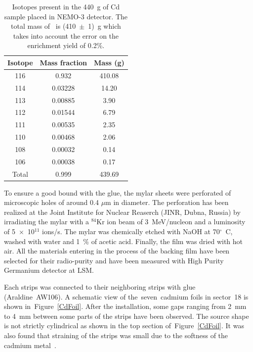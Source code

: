 \documentclass[main.tex]{subfiles}
\begin{document}
\begin{table}[h!]
\begin{center}
\begin{tabular}{c|c|c}
\toprule
Isotope & Mass fraction & Mass (g) \\
\midrule
116   & 0.932   & 410.08 \\[0.05cm]
114   & 0.03228 & 14.20  \\[0.05cm]
113   & 0.00885 & 3.90   \\[0.05cm]
112   & 0.01544 & 6.79   \\[0.05cm]
111   & 0.00535 & 2.35   \\[0.05cm]
110   & 0.00468 & 2.06   \\[0.05cm]
108   & 0.00032 & 0.14   \\[0.05cm]
106   & 0.00038 & 0.17   \\[0.05cm]
Total & 0.999   & 439.69 \\[0.05cm]
\bottomrule
\end{tabular}
\end{center}
\caption{Isotopes present in the 440~g of Cd sample placed in NEMO-3 detector. The total mass of \Cd~is (410~$\pm$~1)~g which takes into account the error on the enrichment yield of 0.2\%.}
\label{tab:IsotopeCdTable}
\end{table}


\bigskip


\NI To ensure a good bound with the glue, the mylar sheets were perforated of microscopic holes of around 0.4 $\mu$m in diameter. The perforation has been realized at the Joint Institute for Nuclear Reaserch (JINR, Dubna, Russia) by irradiating the mylar with a $^{\text{84}}$Kr ion beam of 3~MeV/nucleon and a luminosity of 5~$\times$~10$^{\text{11}}$ ions/s. The mylar was chemically etched with NaOH at 70$^{\circ}$~C, washed with water and 1~\% of acetic acid. Finally, the film was dried with hot air. All the materials entering in the process of the backing film have been selected for their radio-purity and have been measured with High Purity Germanium detector at LSM.


\bigskip


\NI Each strips was connected to their neighboring strips with glue (Araldine~AW106). A schematic view of the~seven~cadmium foils in sector~18 is shown in~Figure~\ref{CdFoil}. After the installation, some gaps ranging from 2~mm to 4~mm between some parts of the strips have been observed. The source shape is not strictly cylindrical as shown in the top section of~Figure~\ref{CdFoil}. It was also found that straining of the strips was small due to the softness of the cadmium metal~\cite{SoftnessCdMetal}. 
\end{document}
